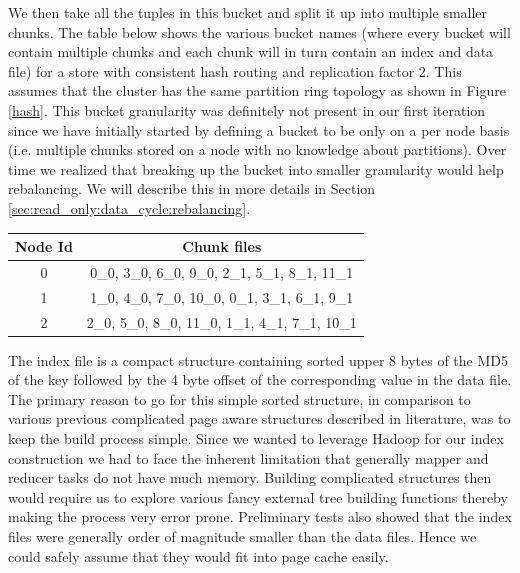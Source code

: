 \documentclass[10pt,twocolumn,preprint,natbib,authoryear]{sigplanconf}
\begin{document}
We then take all the tuples in this bucket and split it up into multiple smaller chunks. The table below shows the various bucket names (where every bucket will contain multiple chunks and each chunk will in turn contain an index and data file) for a store with consistent hash routing and replication factor 2. This assumes that the cluster has the same partition ring topology as shown in Figure \ref{hash}. This bucket granularity was definitely not present in our first iteration since we have initially started by defining a bucket to be only on a per node basis (i.e. multiple chunks stored on a node with no knowledge about partitions). Over time we realized that breaking up the bucket into smaller granularity would help rebalancing. We will describe this in more details in Section \ref{sec:read_only:data_cycle:rebalancing}. 

\begin{center}
    \begin{tabular}{ | c | c | }
    \hline
    Node Id & Chunk files \\ \hline
    0 &  0\_0, 3\_0, 6\_0, 9\_0,      2\_1, 5\_1, 8\_1, 11\_1	\\
   1 &   1\_0, 4\_0, 7\_0, 10\_0,      0\_1, 3\_1, 6\_1, 9\_1		\\
   2 &    2\_0, 5\_0, 8\_0, 11\_0,    1\_1, 4\_1, 7\_1, 10\_1		\\
\hline
    \end{tabular}
\end{center}


The index file is a compact structure containing sorted upper 8 bytes of the MD5 of the key followed by the 4 byte offset of the corresponding value in the data file. The primary reason to go for this simple sorted structure, in comparison to various previous complicated page aware structures described in literature, was to keep the build process simple. Since we wanted to leverage Hadoop for our index construction we had to face the inherent limitation that generally mapper and reducer tasks do not have much memory. Building complicated structures then would require us to explore various fancy external tree building functions thereby making the process very error prone. Preliminary tests also showed that the index files were generally order of magnitude smaller than the data files. Hence we could safely assume that they would fit into page cache easily. 
\end{document}
